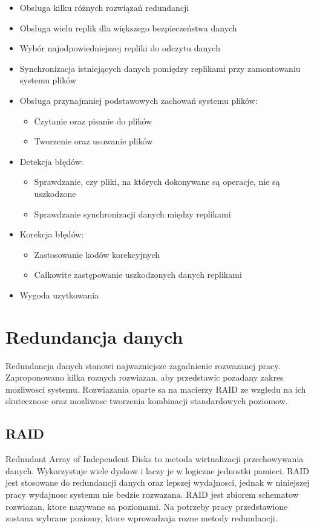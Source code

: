 \begin{itemize}
    \item Obsługa kilku różnych rozwiązań redundancji
    \item Obsługa wielu replik dla większego bezpieczeństwa danych 
    \item Wybór najodpowiedniejszej repliki do odczytu danych
    \item Synchronizacja istniejących danych pomiędzy replikami przy zamontowaniu systemu plików
	\item Obsługa przynajmniej podstawowych zachowań systemu plików:
		\begin{itemize}
			\item Czytanie oraz pisanie do plików
			\item Tworzenie oraz usuwanie plików
		\end{itemize}
	\item Detekcja błędów:
		\begin{itemize}
			\item Sprawdzanie, czy pliki, na których dokonywane są operacje, nie są uszkodzone
			\item Sprawdzanie synchronizacji danych między replikami
		\end{itemize}
	\item Korekcja błędów:
		\begin{itemize}
			\item Zastosowanie kodów korekcyjnych
			\item Całkowite zastępowanie uszkodzonych danych replikami
		\end{itemize}
    \item Wygoda uzytkowania
\end{itemize}

\section {Redundancja danych}
Redundancja danych stanowi najwazniejsze zagadnienie rozwazanej pracy. Zaproponowano kilka roznych rozwiazan, aby przedstawic pozadany zakres mozliwosci systemu. Rozwiazania oparte sa na macierzy RAID ze wzgledu na ich skutecznosc oraz mozliwosc tworzenia kombinacji standardowych poziomow.

\subsection {RAID}
Redundant Array of Independent Disks to metoda wirtualizacji przechowywania danych. Wykorzystuje wiele dyskow i laczy je w logiczne jednostki pamieci. RAID jest stosowane do redundancji danych oraz lepszej wydajnosci, jednak w niniejszej pracy wydajnosc systemu nie bedzie rozwazana.  
RAID jest zbiorem schematow rozwiazan, ktore nazywane sa poziomami. Na potrzeby pracy przedstawione zostana wybrane poziomy, ktore wprowadzaja rozne metody redundancji.
